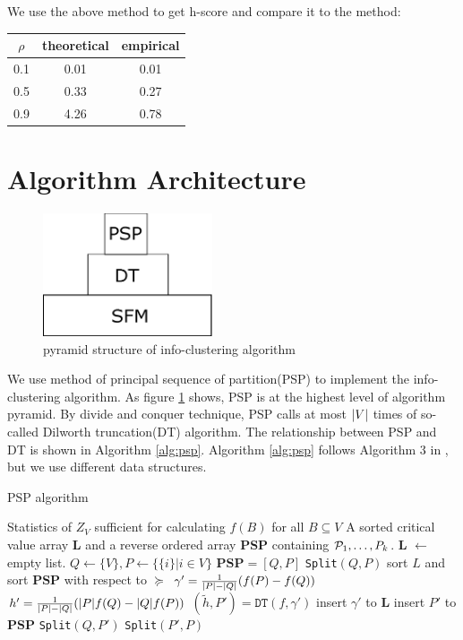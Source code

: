 \documentclass{article}
\begin{document}
We use the above method to get h-score and compare it to the method:

\begin{table}[!ht]
\centering
\begin{tabular}{ccc}
\hline
$\rho$ & theoretical & empirical \\
\hline
0.1 & 0.01 & 0.01 \\
0.5 & 0.33 & 0.27 \\
0.9 & 4.26 & 0.78 \\
\hline
\end{tabular}
\end{table}


\section{Algorithm Architecture}
\begin{figure}[!ht]
\centering
\includegraphics[width=5cm]{pic/pyramid.eps}
\caption{pyramid structure of info-clustering algorithm}\label{fig:ps}
\end{figure}
We use method of principal sequence of partition(PSP) to implement the info-clustering algorithm. As figure \ref{fig:ps} shows, PSP is at the highest level of algorithm pyramid. By divide and conquer technique, PSP calls at most $\abs{V}$ times of so-called Dilworth truncation(DT) algorithm. The relationship between PSP and DT is shown in Algorithm \ref{alg:psp}. Algorithm \ref{alg:psp} follows Algorithm 3 in \cite{ic}, but we use different data structures.
\begin{algorithm}
\caption{PSP algorithm}\label{alg:psp}
\begin{algorithmic}[1]
\REQUIRE Statistics of $Z_V$ sufficient for calculating $f(B)$ for all $B \subseteq V$
\ENSURE A sorted critical value array \textbf{L} and a reverse ordered array \textbf{PSP} containing $\P_1,\dots, P_k$.
\STATE \textbf{L}  $\leftarrow$ empty list.
\STATE $Q\leftarrow \{V\}, P \leftarrow \{ \{i \} | i \in V\}$
\STATE $\mathbf{PSP}= [Q, P]$
\STATE \texttt{Split}$(Q,P)$
\STATE sort $L$ and sort $\mathbf{PSP}$ with respect to $\succeq$ 
 \STATE\label{alg:gamma} $\gamma' = {1 \over \abs{P} - \abs{Q}} (f(P)-f(Q))$
 \STATE $h' = {1 \over \abs{P} - \abs{Q}}(\abs{P} f(Q) - \abs{Q} f(P))$
 \STATE $(\tilde{h}, P') = \texttt{DT}(f,\gamma')$ \footnotemark
 	\STATE insert $\gamma'$ to $\mathbf{L}$
 \ELSE
 	\STATE insert $P'$ to $\mathbf{PSP}$
 	\STATE \texttt{Split}$(Q, P')$
 	\STATE \texttt{Split}$(P',P)$
 \ENDIF
\ENDFUNCTION
\end{algorithmic}
\end{algorithm}
\end{document}
